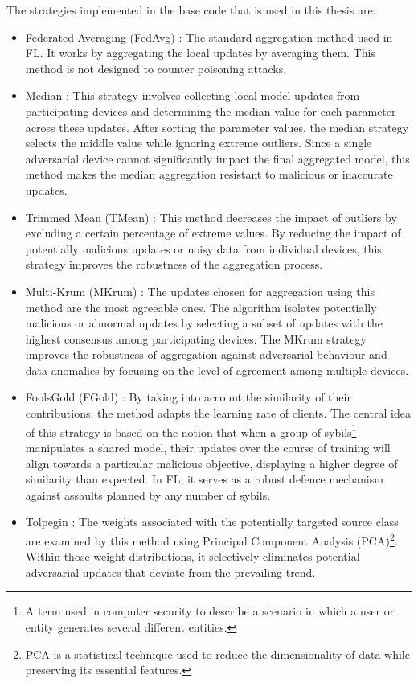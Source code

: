 The strategies implemented in the base code that is used in this thesis \cite{LFighter_code} are:
\begin{itemize}
        \item Federated Averaging (FedAvg) \cite{FederatedLearningPaper}: The standard aggregation method used in FL. It works by aggregating the local updates by averaging them. This method is not designed to counter poisoning attacks.
        \item Median \cite{MedianPaper}: This strategy involves collecting local model updates from participating devices and determining the median value for each parameter across these updates. After sorting the parameter values, the median strategy selects the middle value while ignoring extreme outliers. Since a single adversarial device cannot significantly impact the final aggregated model, this method makes the median aggregation resistant to malicious or inaccurate updates.
        \item Trimmed Mean (TMean) \cite{MedianPaper}: This method decreases the impact of outliers by excluding a certain percentage of extreme values. By reducing the impact of potentially malicious updates or noisy data from individual devices, this strategy improves the robustness of the aggregation process.
        \item Multi-Krum (MKrum) \cite{MKrumPaper}: The updates chosen for aggregation using this method are the most agreeable ones. The algorithm isolates potentially malicious or abnormal updates by selecting a subset of updates with the highest consensus among participating devices. The MKrum strategy improves the robustness of aggregation against adversarial behaviour and data anomalies by focusing on the level of agreement among multiple devices.
        \item FoolsGold (FGold) \cite{FoolsGoldPaper}: By taking into account the similarity of their contributions, the method adapts the learning rate of clients. The central idea of this strategy is based on the notion that when a group of sybils\footnote{A term used in computer security to describe a scenario in which a user or entity generates several different entities.} manipulates a shared model, their updates over the course of training will align towards a particular malicious objective, displaying a higher degree of similarity than expected. In FL, it serves as a robust defence mechanism against assaults planned by any number of sybils.
        \item Tolpegin \cite{TolpeginPaper}: The weights associated with the potentially targeted source class are examined by this method using Principal Component Analysis (PCA)\footnote{PCA  is a statistical technique used to reduce the dimensionality of data while preserving its essential features.}. Within those weight distributions, it selectively eliminates potential adversarial updates that deviate from the prevailing trend.

\end{itemize}
